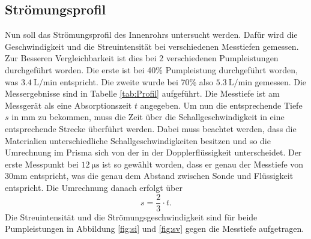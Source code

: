 \subsection{Strömungsprofil}
Nun soll das Strömungsprofil des Innenrohrs untersucht werden. Dafür wird die Geschwindigkeit und 
die Streuintensität bei verschiedenen Messtiefen gemessen. Zur Besseren Vergleichbarkeit ist dies bei 2 verschiedenen 
Pumpleistungen durchgeführt worden. Die erste ist bei 40\% Pumpleistung durchgeführt worden, was $\qty{3.4}{\liter\per\minute}$ entspricht.
Die zweite wurde bei 70\% also $\qty{5.3}{\liter\per\minute}$ gemessen. Die Messergebnisse sind in Tabelle \ref{tab:Profil} aufgeführt.
Die Messtiefe ist am Messgerät als eine Absorptionszeit $t$ angegeben. Um nun die entsprechende Tiefe $s$ in mm zu bekommen, muss
die Zeit über die Schallgeschwindigkeit in eine entsprechende Strecke überführt werden. Dabei muss beachtet werden, dass die Materialien unterschiedliche
Schallgeschwindigkeiten besitzen und so die Umrechnung im Prisma sich von der in der Dopplerflüssigkeit unterscheidet. Der erste Messpunkt
bei $\qty{12}{\micro\second}$ ist so gewählt worden, dass er genau der Messtiefe von 30mm entspricht, was die genau dem Abstand zwischen Sonde
und Flüssigkeit entspricht. Die Umrechnung danach erfolgt über
\begin{equation}
  s=\frac{2}{3}\cdot t.
\end{equation}
Die Streuintensität und die Strömungsgeschwindigkeit sind für beide Pumpleistungen in Abbildung \ref{fig:si} und \ref{fig:sv} gegen die Messtiefe aufgetragen. 
